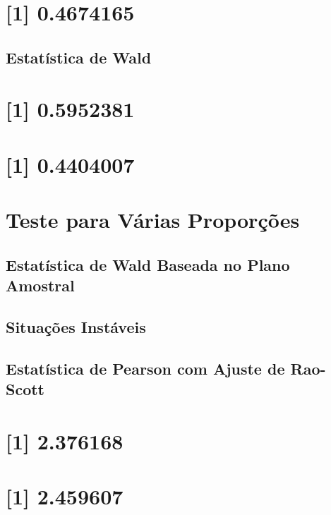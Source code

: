 \documentclass[]{book}
\theoremstyle{definition}
\theoremstyle{definition}
\theoremstyle{definition}
\theoremstyle{remark}
\begin{document}
\section{{[}1{]} 0.4674165}\label{section-29}

\subsection{Estatística de Wald}\label{estatistica-de-wald}

\section{{[}1{]} 0.5952381}\label{section-30}

\section{{[}1{]} 0.4404007}\label{section-31}

\section{Teste para Várias
Proporções}\label{teste-para-varias-proporcoes}

\subsection{Estatística de Wald Baseada no Plano
Amostral}\label{estatistica-de-wald-baseada-no-plano-amostral}

\subsection{Situações Instáveis}\label{situacoes-instaveis}

\subsection{Estatística de Pearson com Ajuste de
Rao-Scott}\label{raoscott}

\section{{[}1{]} 2.376168}\label{section-32}

\section{{[}1{]} 2.459607}\label{section-33}
\end{document}
